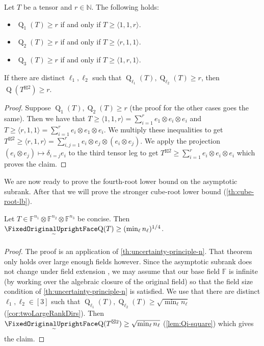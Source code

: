 \documentclass[11pt]{article}
\makeatletter
\DeclareMathOperator{\subrank}{Q}
\newcommand{\FF}{\mathbb{F}}
\newcommand{\NN}{\mathbb{N}}
\edef\FixedOriginalLowerTilde{\noexpand\mathchar\number\numexpr\symlargesymbols*256+101\relax}
\newcommand{\FixedQGlyphStyle}[2]{\begingroup\setbox0=\hbox{$\m@th#1\text{\normalfont\FixedOriginalUprightFace Q}$}\setbox2=\hbox{$\m@th#1\FixedOriginalLowerTilde$}\dimen0=\dp0\advance\dimen0 by\ht2\advance\dimen0 by1.23pt\typeout{FIXEDGLYPH Q STYLE\meaning#1 BASEwidth=\the\wd0 BASEheight=\the\ht0 BASEdepth=\the\dp0 TILDEwidth=\the\wd2 TILDEheight=\the\ht2 TILDEdepth=\the\dp2 LOWER=\the\dimen0}\hbox{\rlap{\hbox to\wd0{\hss\lower\dimen0\copy2\hss}}\box0}\endgroup}
\DeclareMathOperator{\asympsubrank}{\mathpalette\FixedQGlyphStyle\relax}
\makeatother
\begin{document}
\begin{lemma}\label{lem:Qi-mamu}
Let $T$ be a tensor and $r \in \NN$. The following holds:
\begin{itemize}
\item $\subrank_1(T) \geq r$ if and only if $T \geq \langle 1, 1,r \rangle$.
\item $\subrank_2(T) \geq r$ if and only if $T \geq \langle r, 1,1 \rangle$.
\item $\subrank_3(T) \geq r$ if and only if $T \geq \langle 1, r, 1 \rangle$.  
\end{itemize}
\end{lemma}

\begin{lemma}\label{lem:Qi-square}
    If there are distinct ${\ell_1},{\ell_2}$ such that $\subrank_{\ell_1}(T), \subrank_{\ell_2}(T) \geq r$, then $\subrank(T^{\boxtimes 2}) \geq r$.
\end{lemma}

\begin{proof}
Suppose $\subrank_1(T), \subrank_2(T) \geq r$ (the proof for the other cases goes the same). Then we have that
$
T \geq \langle1, 1, r\rangle =  \sum_{i=1}^r e_1 \otimes e_i \otimes e_i$ and 
$T \geq \langle r, 1, 1\rangle = \sum_{i=1}^r e_i \otimes e_1 \otimes e_i$.
%
We multiply these inequalities to get
$T^{\boxtimes 2} \geq \langle r,1,r\rangle= \sum_{i,j=1}^r e_i \otimes e_j \otimes (e_i \otimes e_j).
$
We apply the projection $(e_i \otimes e_j) \mapsto \delta_{i=j} e_i$ to the third tensor leg to get
$
T^{\boxtimes 2} \geq \sum_{i=1}^r e_i \otimes e_i \otimes e_i
$
which proves the claim.
\end{proof}

We are now ready to prove the fourth-root lower bound on the asymptotic subrank. After that we will prove the stronger cube-root lower bound (\autoref{th:cube-root-lb}).

\begin{theorem}\label{th:fourth-root}
    Let $T \in \FF^{n_1} \otimes \FF^{n_2} \otimes \FF^{n_3}$ be concise. Then $\asympsubrank(T) \geq (\min_\ell n_\ell)^{1/4}$.
\end{theorem}
\begin{proof}
The proof is an application of \autoref{th:uncertainty-principle-n}.
That theorem only holds over large enough fields however. 
Since the asymptotic subrank does not change under field extension \cite[Theorem~3.10]{strassen1988asymptotic}, we may assume that our base field $\FF$ is infinite (by working over the algebraic closure of the original field) so that the field size condition of \autoref{th:uncertainty-principle-n} is satisfied. %
We use that there are distinct $\ell_1, \ell_2 \in [3]$ such that 
$\subrank_{\ell_1}(T), \subrank_{\ell_2}(T) \geq \sqrt{\min_\ell n_\ell}$ (\autoref{cor:twoLargeRankDirs}).
Then $\asympsubrank(T^{\boxtimes 2}) \geq \sqrt{\min_\ell n_\ell}$ (\autoref{lem:Qi-square}) which gives the claim. %
\end{proof}
\end{document}
